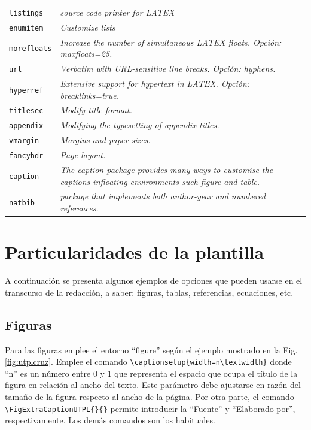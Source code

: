 \begin{longtable}{p{} p{}}
	\texttt{listings} 	& \textit{source code printer for LATEX }	 \\
	\texttt{enumitem} 	& \textit{Customize lists} \\
	\texttt{morefloats} & \textit{Increase the number of simultaneous LATEX floats. Opción: maxfloats=25.} \\
	\texttt{url} 		& \textit{Verbatim with URL-sensitive line breaks. Opción: hyphens.} \\
	\texttt{hyperref} 	& \textit{Extensive support for hypertext in LATEX. Opción: breaklinks=true.} \\
	\texttt{titlesec} 	& \textit{Modify title format.} \\
	\texttt{appendix}   & \textit{Modifying the typesetting of appendix titles.} \\
	\texttt{vmargin} 	& \textit{Margins and paper sizes.} \\
	\texttt{fancyhdr} 	& \textit{Page layout.}\\
	\texttt{caption} 	& \textit{The caption package provides many ways to customise the captions infloating environments such figure and table.}\\
	\texttt{natbib} 	& \textit{package that implements both author-year and numbered references.}

\end{longtable} 


\section{Particularidades de la plantilla}

A continuación se presenta algunos ejemplos de opciones que pueden usarse en el transcurso de la redacción, a saber: figuras, tablas, referencias, ecuaciones, etc. 

\subsection{Figuras}

Para las figuras emplee el entorno ``figure'' según el ejemplo mostrado en la Fig. \ref{fig:utplcruz}. Emplee el comando \lstinline|\captionsetup{width=n\textwidth}| donde ``n'' es un número entre 0 y 1 que representa el espacio que ocupa el título de la figura en relación al ancho del texto. Este parámetro debe ajustarse en razón del tamaño de la figura respecto al ancho de la página. Por otra parte, el comando \lstinline|\FigExtraCaptionUTPL{}{}| permite introducir la ``Fuente'' y ``Elaborado por'', respectivamente. Los demás comandos son los habituales. 

